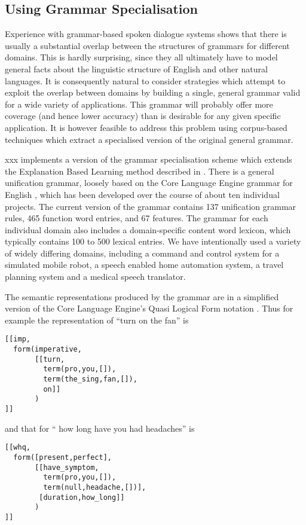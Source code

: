\documentclass[11pt,twoside]{article}
\begin{document}
\subsection{Using Grammar Specialisation}

Experience with grammar-based spoken dialogue systems shows that there
is usually a substantial overlap between the structures of grammars
for different domains. This is hardly surprising, since they all
ultimately have to model general facts about the linguistic structure
of English and other natural languages. It is consequently natural to
consider strategies which attempt to exploit the overlap between
domains by building a single, general grammar valid for a wide variety
of applications. This grammar will probably offer more coverage (and
hence lower accuracy) than is desirable for any given specific
application. It is however feasible to address this problem using
corpus-based techniques which extract a specialised version of the
original general grammar.

{\sc xxx} implements a version of the grammar specialisation scheme
which extends the Explanation Based Learning method described
in \cite{RaynerHockeyDowding2002}. There is a general unification
grammar, loosely based on the Core Language Engine grammar for English
\cite{Pulman92}, which has been developed over the course of about ten
individual projects. The current version of the grammar contains 137
unification grammar rules, 465 function word entries, and 67 features.
The grammar for each individual domain also includes a domain-specific
content word lexicon, which typically contains 100 to 500 lexical
entries. We have intentionally used a variety of widely differing
domains, including a command and control system for a simulated mobile
robot, a speech enabled home automation system, a travel planning
system and a medical speech translator.

The semantic representations produced by the grammar are in a simplified
version of the Core Language Engine's Quasi Logical Form notation
\cite{VanEijckMoore92}. Thus for example the representation of 
``turn on the fan'' is 
\begin{verbatim}
[[imp,
  form(imperative,
       [[turn,
         term(pro,you,[]),
         term(the_sing,fan,[]),
         on]]
       )
]]
\end{verbatim}
and that for `` how long have you had headaches'' is 
\begin{verbatim}
[[whq,
  form([present,perfect],
       [[have_symptom,
         term(pro,you,[]),
         term(null,headache,[])],
        [duration,how_long]]
       )
]]
\end{verbatim}
\end{document}
